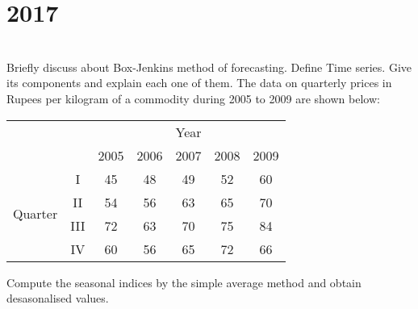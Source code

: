 \section*{2017}
\vspace{-.5cm}
\hrulefill \smallskip\\
 Briefly discuss about Box-Jenkins method of forecasting.
\myline
{} Define Time series. Give its components and explain each one of them.
\myline
{} The data on quarterly prices in Rupees per kilogram of a commodity during 2005 to 2009 are shown below:
\begin{center}
    \begin{tabular}{c|*{6}{c|}}
    \multicolumn{2}{c}{}& \multicolumn{5}{c}{Year}\\ \cline{3-7}
    \multicolumn{2}{c|}{}&  2005 & 2006 & 2007 & 2008 & 2009 \\ \cline{2-7}
    \multirow{4}{*}{Quarter}& I & 45 & 48 & 49 & 52 & 60 \\
    & II & 54 & 56 & 63 & 65 & 70 \\
    & III & 72 & 63 & 70 & 75 & 84 \\
    & IV & 60 & 56 & 65 & 72 & 66 \\\cline{2-7}
    \end{tabular}
\end{center} Compute the seasonal indices by the simple average method and obtain desasonalised values.
